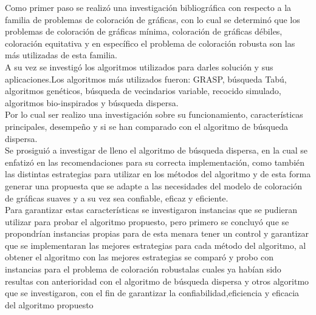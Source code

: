 Como  primer  paso  se  realizó  una  investigación bibliográfica con  respecto a  la  familia  de problemas de coloración de gráficas, con lo cual se determinó que los problemas de coloración de  gráficas  mínima,  coloración  de  gráficas  débiles,  coloración  equitativa  y  en  específico  el problema de coloración robusta son las más utilizadas de esta familia.\\ 
A su vez se investigó los algoritmos utilizados para darles solución y sus aplicaciones.Los algoritmos más utilizados fueron: GRASP, búsqueda Tabú, algoritmos genéticos, búsqueda de vecindarios variable, recocido simulado, algoritmos bio-inspirados y búsqueda dispersa.\\ 
Por lo  cual  ser  realizo  una  investigación  sobre  su  funcionamiento,  características  principales, desempeño y si se han comparado con el algoritmo de búsqueda dispersa.\\ 
Se prosiguió a investigar de lleno el algoritmo de búsqueda dispersa, en la cual se enfatizó en las  recomendaciones  para  su  correcta  implementación,  como  también  las  distintas  estrategias para utilizar en los métodos del algoritmo y de esta forma generar una propuesta que se adapte a las necesidades del modelo de coloración de gráficas suaves y a su vez sea confiable, eficaz y eficiente.\\ 
Para garantizar estas características se investigaron instancias que se pudieran utilizar para  probar  el  algoritmo  propuesto,  pero  primero  se  concluyó  que  se  propondrían  instancias propias  para  de  esta  menara  tener  un  control  y  garantizar  que  se  implementaran  las  mejores estrategias para cada método del algoritmo, al obtener el algoritmo con las mejores estrategias se comparó y probo con instancias para el problema de coloración robustalas cuales ya habían sido resultas con anterioridad con el algoritmo de búsqueda dispersa y otros algoritmo que se investigaron,  con  el  fin  de  garantizar    la  confiabilidad,eficiencia  y  eficacia  del  algoritmo propuesto
